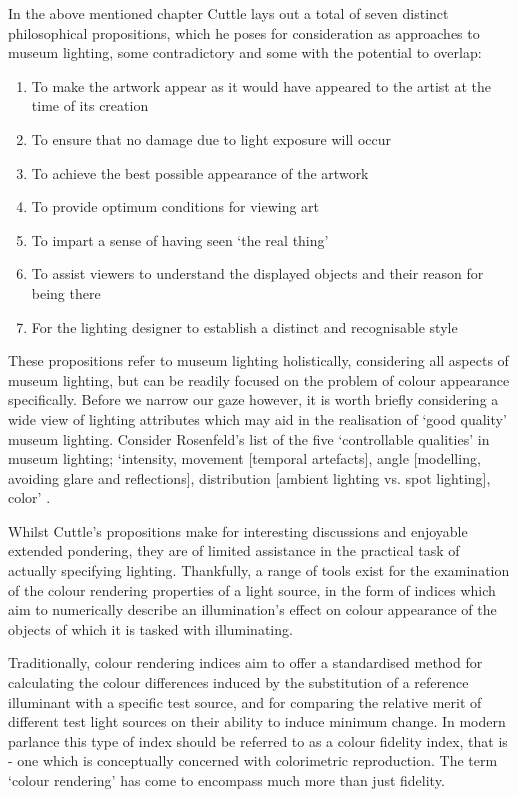 In the above mentioned chapter Cuttle lays out a total of seven distinct philosophical propositions, which he poses for consideration as approaches to museum lighting, some contradictory and some with the potential to overlap:

\begin{enumerate}
\item To make the artwork appear as it would have appeared to the artist at the time of its creation
\item To ensure that no damage due to light exposure will occur
\item To achieve the best possible appearance of the artwork
\item To provide optimum conditions for viewing art
\item To impart a sense of having seen `the real thing'
\item To assist viewers to understand the displayed objects and their reason for being there
\item For the lighting designer to establish a distinct and recognisable style
\end{enumerate}

These propositions refer to museum lighting holistically, considering all aspects of museum lighting, but can be readily focused on the problem of colour appearance specifically. Before we narrow our gaze however, it is worth briefly considering a wide view of lighting attributes which may aid in the realisation of `good quality' museum lighting. Consider Rosenfeld's list of the five `controllable qualities' in museum lighting; `intensity, movement [temporal artefacts], angle [modelling, avoiding glare and reflections], distribution [ambient lighting vs. spot lighting], color' \citep{rosenfeld_agony_2013}.

Whilst Cuttle's propositions make for interesting discussions and enjoyable extended pondering, they are of limited assistance in the practical task of actually specifying lighting. Thankfully, a range of tools exist for the examination of the colour rendering properties of a light source, in the form of indices which aim to numerically describe an illumination's effect on colour appearance of the objects of which it is tasked with illuminating.

Traditionally, colour rendering indices aim to offer a standardised method for calculating the colour differences induced by the substitution of a reference illuminant with a specific test source, and for comparing the relative merit of different test light sources on their ability to induce minimum change. In modern parlance this type of index should be referred to as a colour fidelity index, that is - one which is conceptually concerned with colorimetric reproduction. The term `colour rendering' has come to encompass much more than just fidelity.


